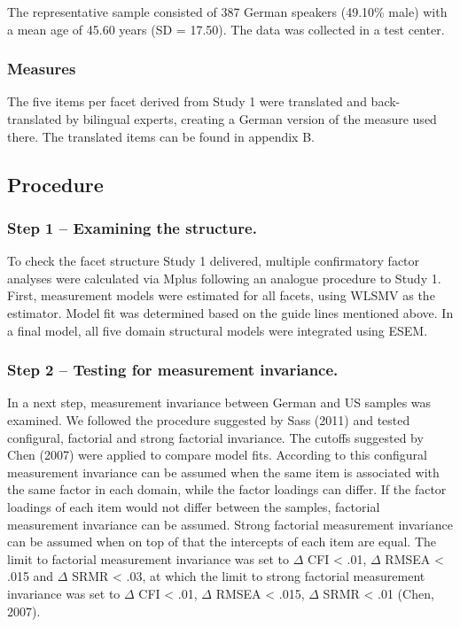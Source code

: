 \documentclass[,man,floatsintext]{apa6}
\begin{document}
The representative sample consisted of 387 German speakers (49.10\%
male) with a mean age of 45.60 years (SD = 17.50). The data was
collected in a test center.

\subsubsection{Measures}\label{measures-1}

The five items per facet derived from Study 1 were translated and
back-translated by bilingual experts, creating a German version of the
measure used there. The translated items can be found in appendix B.

\subsection{Procedure}\label{procedure-1}

\subsubsection{Step 1 -- Examining the
structure.}\label{step-1-examining-the-structure.}

To check the facet structure Study 1 delivered, multiple confirmatory
factor analyses were calculated via Mplus following an analogue
procedure to Study 1. First, measurement models were estimated for all
facets, using WLSMV as the estimator. Model fit was determined based on
the guide lines mentioned above. In a final model, all five domain
structural models were integrated using ESEM.

\subsubsection{Step 2 -- Testing for measurement
invariance.}\label{step-2-testing-for-measurement-invariance.}

In a next step, measurement invariance between German and US samples was
examined. We followed the procedure suggested by Sass (2011) and tested
configural, factorial and strong factorial invariance. The cutoffs
suggested by Chen (2007) were applied to compare model fits. According
to this configural measurement invariance can be assumed when the same
item is associated with the same factor in each domain, while the factor
loadings can differ. If the factor loadings of each item would not
differ between the samples, factorial measurement invariance can be
assumed. Strong factorial measurement invariance can be assumed when on
top of that the intercepts of each item are equal. The limit to
factorial measurement invariance was set to \(\Delta\) CFI \textless{}
.01, \(\Delta\) RMSEA \textless{} .015 and \(\Delta\) SRMR \textless{}
.03, at which the limit to strong factorial measurement invariance was
set to \(\Delta\) CFI \textless{} .01, \(\Delta\) RMSEA \textless{}
.015, \(\Delta\) SRMR \textless{} .01 (Chen, 2007).
\end{document}
